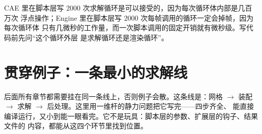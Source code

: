 \documentclass[12pt,a4paper,fontset=fandol]{ctexbook}
\newcommand{\Lang}[1]{\textsf{#1}}
\newcommand{\DomCAE}{\Lang{CAE}}
\newcommand{\DomEngine}{\Lang{Engine}}
\begin{document}
\begin{note}[title={同一句``循环''在两侧的成本差三个数量级}]
\DomCAE{} 里在脚本层写 2000 次求解循环是可以接受的，因为每次循环体内部是几百万次
浮点操作；\DomEngine{} 里在脚本层写 2000 次每帧调用的循环一定会掉帧，因为每次循环体
只有几微秒的工作量，而一次脚本调用的固定开销就有微秒级。写代码前先问``这个循环外层
是求解循环还是渲染循环''。
\end{note}

\section{贯穿例子：一条最小的求解线}
\label{sec:ch01-thread-example}

后面所有章节都需要挂在同一条线上，否则例子会散。这条线是：网格 $\rightarrow$ 装配
$\rightarrow$ 求解 $\rightarrow$ 后处理。这里用一维杆的静力问题把它写完——四步齐全、
能直接编译运行，又小到能一眼看完。它不是玩具：脚本层的参数、扩展层的钩子、结果文件的
内容，都能从这四个环节里找到位置。
\end{document}
